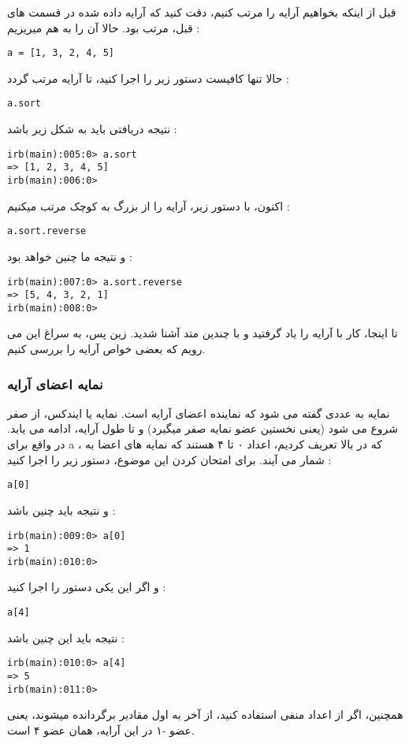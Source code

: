 \documentclass[11pt]{article}
\begin{document}
قبل از اینکه بخواهیم آرایه را مرتب کنیم، دقت کنید که آرایه داده شده در قسمت های قبل، مرتب بود. حالا آن را به هم میریزیم :
\begin{latin}
\begin{verbatim}
a = [1, 3, 2, 4, 5]
\end{verbatim}
\end{latin}
حالا تنها کافیست دستور زیر را اجرا کنید، تا آرایه مرتب گردد :
\begin{latin}
\begin{verbatim}
a.sort
\end{verbatim}
\end{latin}
نتیجه دریافتی باید به شکل زیر باشد :
\begin{latin}
\begin{verbatim}
irb(main):005:0> a.sort
=> [1, 2, 3, 4, 5]
irb(main):006:0> 
\end{verbatim}
\end{latin}
اکنون، با دستور زیر، آرایه را از بزرگ به کوچک مرتب میکنیم :
\begin{latin}
\begin{verbatim}
a.sort.reverse
\end{verbatim}
\end{latin}
و نتیجه ما چنین خواهد بود :
\begin{latin}
\begin{verbatim}
irb(main):007:0> a.sort.reverse
=> [5, 4, 3, 2, 1]
irb(main):008:0> 
\end{verbatim}
\end{latin}
تا اینجا، کار با آرایه را یاد گرفتید و با چندین متد آشنا شدید. زین پس، به سراغ این می رویم که بعضی خواص آرایه را بررسی کنیم. 
\subsubsection{نمایه اعضای آرایه}
نمایه
به عددی گفته می شود که نماینده اعضای آرایه است. نمایه یا ایندکس، از صفر شروع می شود (یعنی نخستین عضو نمایه صفر میگیرد) و تا طول آرایه، ادامه می یابد. در واقع برای a ، که در بالا تعریف کردیم، اعداد ۰ تا ۴ هستند که نمایه های اعضا به شمار می آیند. برای امتحان کردن این موضوع، دستور زیر را اجرا کنید :
\begin{latin}
\begin{verbatim}
a[0]
\end{verbatim}
\end{latin}
و نتیجه باید چنین باشد :
\begin{latin}
\begin{verbatim}
irb(main):009:0> a[0]
=> 1
irb(main):010:0>
\end{verbatim}
\end{latin}
و اگر این یکی دستور را اجرا کنید :
\begin{latin}
\begin{verbatim}
a[4]
\end{verbatim}
\end{latin}
نتیجه باید این چنین باشد :
\begin{latin}
\begin{verbatim}
irb(main):010:0> a[4]
=> 5
irb(main):011:0> 
\end{verbatim}
\end{latin}
همچنین، اگر از اعداد منفی استفاده کنید، از آخر به اول مقادیر برگردانده میشوند، یعنی عضو -۱ در این آرایه، همان عضو ۴ است. 
\end{document}
